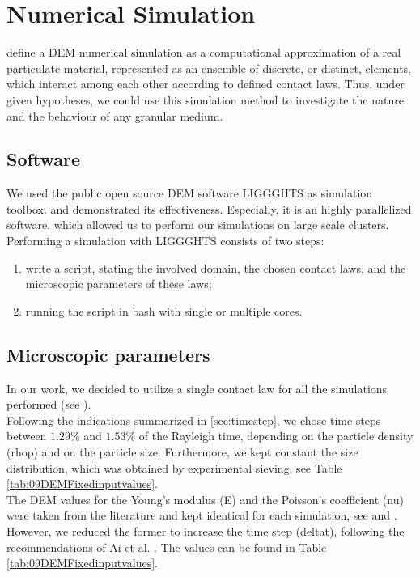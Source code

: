 
\chapter{Numerical Simulation}
\label{cap:numericalsimulation}

\citet{RefWorks:172} define a \acs{DEM} numerical simulation as a computational
approximation of a real particulate material, represented as an ensemble of discrete, or distinct, elements, which
interact among each other according to defined contact laws.
Thus, under given hypotheses, we could use this simulation method to investigate
the nature and the behaviour of any granular medium.\\

\section{Software}
\label{sec:software}

We used the public open source \acs{DEM} software \acs{LIGGGHTS} as simulation toolbox.
\citet{RefWorks:136} and \citet{RefWorks:206} demonstrated its effectiveness.
Especially, it is an highly parallelized software, which allowed us to perform
our simulations on large scale clusters.\\
Performing a simulation with \acs{LIGGGHTS} consists of two steps:
\begin{enumerate}
  \item{write a script, stating the involved domain, the chosen contact laws,
  and the microscopic parameters of these laws;}
  \item{running the script in bash with single or multiple cores.}
\end{enumerate}

\section{Microscopic parameters}
\label{sec:microscopicparameters}

In our work, we decided to utilize a single
contact law for all the simulations performed (see \citet{RefWorks:205}).\\
Following the indications summarized in \ref{sec:timestep}, we chose time
steps between $1.29 \%$ and $1.53 \%$ of the Rayleigh time, 
depending on the particle density (\acs{rhop}) and on the particle size.
Furthermore, we kept constant the size distribution, which was obtained by
experimental sieving, see Table \ref{tab:09DEMFixedinputvalues}.\\
The \acs{DEM} values for the Young's modulus (\acs{E}) and the Poisson's
coefficient (\acs{nu}) were taken from the literature and kept identical for
each simulation, see \cite{RefWorks:175} and \cite{RefWorks:176}. However, we
reduced the former to increase the time step (\acs{deltat}), following the recommendations of Ai et al.
\cite{RefWorks:131}.
The values can be found in Table \ref{tab:09DEMFixedinputvalues}.
\\

